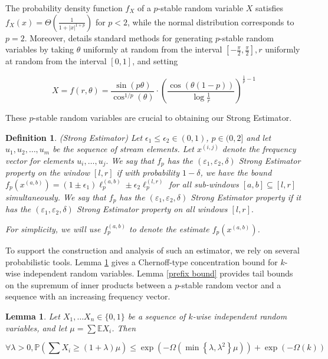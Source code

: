 \documentclass{article}
\newcommand{\est}{\textsf{Strong Estimator }}
\newcommand{\estt}{\textsf{Strong Estimator}}
\newcommand{\eps}{\varepsilon}
\theoremstyle{plain}
\newtheorem{lem}[theorem]{Lemma}
\newtheorem{defn}[theorem]{Definition}
\begin{document}
The probability density function $f_X$ of a $p$-stable random variable $X$ satisfies $f_X(x)=\Theta\left(\frac{1}{1+|x|^{1+p}}\right)$ for $p<2$, while the normal distribution corresponds to $p=2$. Moreover, \cite{Nolan2001StableDM} details standard methods for generating $p$-stable random variables by taking $\theta$ uniformly at random from the interval $\left[-\frac{\pi}{2}, \frac{\pi}{2}\right], r$ uniformly at random from the interval $[0,1]$, and setting

$$
X=f(r, \theta)=\frac{\sin (p \theta)}{\cos ^{1 / p}(\theta)} \cdot\left(\frac{\cos (\theta(1-p))}{\log \frac{1}{r}}\right)^{\frac{1}{p}-1}
$$


These $p$-stable random variables are crucial to obtaining our \estt.


\begin{defn}\label{Strong Estimator}(\estt)
    Let $\epsilon_1 \leq \epsilon_2 \in (0, 1)$,  $ p \in (0, 2]$ and let $u_1, u_2, \dots, u_m$ be the sequence of stream elements. Let $x ^ {(i, j)}$ denote the frequency vector for elements $u_i, \dots, u_j.$
 We say that $f_p$ has the $(\eps_1, \eps_2, \delta)$  \est property on the window $[l,r]$ if with probability $1-\delta$, we have the bound $f_p(x ^ {(a,b)}) = (1 \pm \epsilon_1) \ell_p ^ {(a, b)} \pm  \epsilon_2 \ell_p ^ {(l,r)}$ for all sub-windows $[a,b]\subseteq [l,r]$ simultaneously. We say that $f_p$ has the $(\eps_1, \eps_2, \delta)$ \est property if it has the $(\eps_1, \eps_2, \delta)$ \est property on all windows $[l,r].$ 

    For simplicity, we will use $f_p ^ {(a, b)}$ to denote the estimate $f_p(x ^ {(a, b)})$. 
\end{defn}


To support the construction and analysis of such an estimator, we rely on several probabilistic tools. Lemma \ref{cher} gives a Chernoff-type concentration bound for $k$-wise independent random variables. Lemma \ref{prefix bound} provides tail bounds on the supremum of inner products between a $p$-stable random vector and a sequence with an increasing frequency vector. 

\begin{lem}\label{cher}\cite{bellare1994randomness} Let $X_1, \ldots X_n \in\{0,1\}$ be a sequence of $k$-wise independent random variables, and let $\mu=\sum \mathbb{E} X_i$. Then

$$
\forall \lambda>0, \mathbb{P}\left(\sum X_i \geq(1+\lambda) \mu\right) \leq \exp \left(-\Omega\left(\min \left\{\lambda, \lambda^2\right\} \mu\right)\right)+\exp (-\Omega(k))
$$
    
\end{lem}
\end{document}
